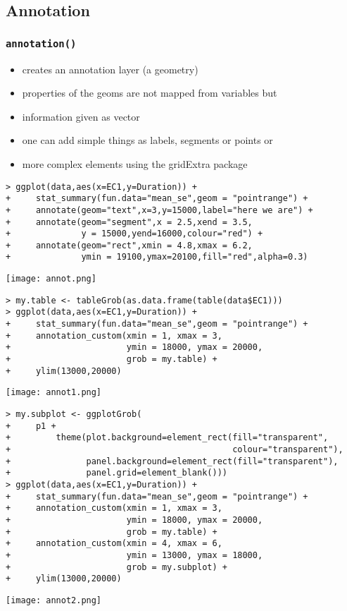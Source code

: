 \subsection{Annotation}
\begin{frame}\frametitle{\texttt{annotation()}}
  \begin{itemize}
  \item creates an annotation layer (a geometry)
  \item properties of the geoms are not mapped from variables but
  \item information given as vector
  \item one can add simple things as labels, segments or points or
  \item more complex elements using the gridExtra package
  \end{itemize}\tiny
\begin{verbatim}
> ggplot(data,aes(x=EC1,y=Duration)) +
+     stat_summary(fun.data="mean_se",geom = "pointrange") +
+     annotate(geom="text",x=3,y=15000,label="here we are") +
+     annotate(geom="segment",x = 2.5,xend = 3.5, 
+              y = 15000,yend=16000,colour="red") +
+     annotate(geom="rect",xmin = 4.8,xmax = 6.2, 
+              ymin = 19100,ymax=20100,fill="red",alpha=0.3)
\end{verbatim}
\begin{center}
  \texttt{[image: annot.png]}
\end{center}
\begin{verbatim}
> my.table <- tableGrob(as.data.frame(table(data$EC1)))
> ggplot(data,aes(x=EC1,y=Duration)) +
+     stat_summary(fun.data="mean_se",geom = "pointrange") +
+     annotation_custom(xmin = 1, xmax = 3, 
+                       ymin = 18000, ymax = 20000,
+                       grob = my.table) +
+     ylim(13000,20000)  
\end{verbatim}
\begin{center}
  \texttt{[image: annot1.png]}
\end{center}
\begin{verbatim}
> my.subplot <- ggplotGrob(
+     p1 +
+         theme(plot.background=element_rect(fill="transparent",
+                                            colour="transparent"),
+               panel.background=element_rect(fill="transparent"),
+               panel.grid=element_blank()))
> ggplot(data,aes(x=EC1,y=Duration)) +
+     stat_summary(fun.data="mean_se",geom = "pointrange") +
+     annotation_custom(xmin = 1, xmax = 3, 
+                       ymin = 18000, ymax = 20000,
+                       grob = my.table) +
+     annotation_custom(xmin = 4, xmax = 6, 
+                       ymin = 13000, ymax = 18000,
+                       grob = my.subplot) +
+     ylim(13000,20000)  
\end{verbatim}
\begin{center}
  \texttt{[image: annot2.png]}
\end{center}
\end{frame}

